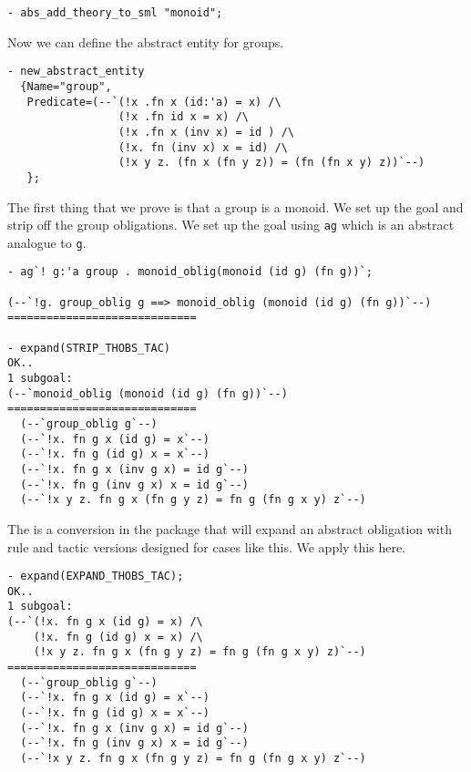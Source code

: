 \begin{small}
\begin{verbatim}
- abs_add_theory_to_sml "monoid";
\end{verbatim}
\end{small}

Now we can define the abstract entity for groups.

\begin{small}
\begin{verbatim}
- new_abstract_entity 
  {Name="group",
   Predicate=(--`(!x .fn x (id:'a) = x) /\
                 (!x .fn id x = x) /\
                 (!x .fn x (inv x) = id ) /\
                 (!x. fn (inv x) x = id) /\
                 (!x y z. (fn x (fn y z)) = (fn (fn x y) z))`--)
   };
\end{verbatim}
\end{small}

The first thing that we prove is that a group is a monoid. We set up the
goal and strip off the group obligations. We set up the goal using
\verb!ag! which is an abstract analogue to \verb!g!.

\begin{small}
\begin{verbatim}
- ag`! g:'a group . monoid_oblig(monoid (id g) (fn g))`;

(--`!g. group_oblig g ==> monoid_oblig (monoid (id g) (fn g))`--)
=============================

- expand(STRIP_THOBS_TAC)
OK..
1 subgoal:
(--`monoid_oblig (monoid (id g) (fn g))`--)
=============================
  (--`group_oblig g`--)
  (--`!x. fn g x (id g) = x`--)
  (--`!x. fn g (id g) x = x`--)
  (--`!x. fn g x (inv g x) = id g`--)
  (--`!x. fn g (inv g x) x = id g`--)
  (--`!x y z. fn g x (fn g y z) = fn g (fn g x y) z`--)
\end{verbatim}
\end{small}

The is a conversion in the package that will expand an abstract obligation
with rule and tactic versions designed for cases like this. We apply this
here.

\begin{small}
\begin{verbatim}
- expand(EXPAND_THOBS_TAC);
OK..
1 subgoal:
(--`(!x. fn g x (id g) = x) /\
    (!x. fn g (id g) x = x) /\
    (!x y z. fn g x (fn g y z) = fn g (fn g x y) z)`--)
=============================
  (--`group_oblig g`--)
  (--`!x. fn g x (id g) = x`--)
  (--`!x. fn g (id g) x = x`--)
  (--`!x. fn g x (inv g x) = id g`--)
  (--`!x. fn g (inv g x) x = id g`--)
  (--`!x y z. fn g x (fn g y z) = fn g (fn g x y) z`--)
\end{verbatim}
\end{small}

